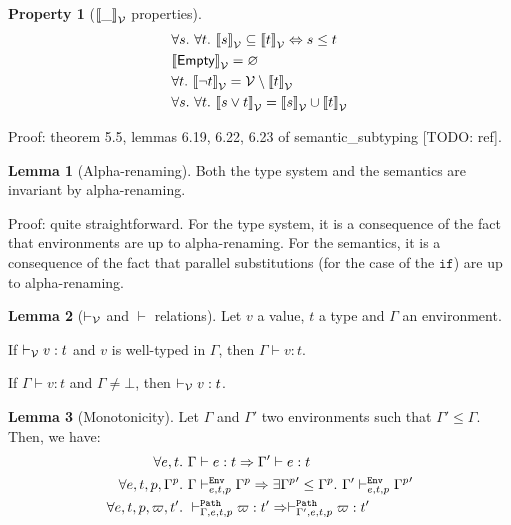 \documentclass[a4paper]{article}
\theoremstyle{definition}
\newtheorem{lemma}{Lemma}
\newtheorem{property}{Property}
\begin{document}
        \begin{property}[$\valsemantic \_$ properties]
          \begin{align*}
            &\forall s.\ \forall t.\ \valsemantic s \subseteq \valsemantic t \Leftrightarrow s \leq t\\
            &\valsemantic \Empty = \varnothing\\
            &\forall t.\ \valsemantic {\neg t} = \values \setminus \valsemantic t\\
            &\forall s.\ \forall t.\ \valsemantic {s\vee t} = \valsemantic s \cup \valsemantic t
          \end{align*}
        \end{property}
        Proof: theorem 5.5, lemmas 6.19, 6.22, 6.23 of semantic_subtyping [TODO: ref].

        \begin{lemma}[Alpha-renaming]
          Both the type system and the semantics are invariant by alpha-renaming.
        \end{lemma}
        Proof: quite straightforward.
        For the type system, it is a consequence of the fact that environments are up to alpha-renaming.
        For the semantics, it is a consequence of the fact that parallel substitutions (for the case of the $\texttt{if}$)
        are up to alpha-renaming.

        \begin{lemma}[$\vvdash$ and $\vdash$ relations]Let $v$ a value, $t$ a type and $\Gamma$ an environment.

          If $\vvdash v:t$ and $v$ is well-typed in $\Gamma$, then $\Gamma\vdash v:t$.

          If $\Gamma \vdash v:t$ and $\Gamma\neq\bot$, then $\vvdash v:t$.
        \end{lemma}
    
        \begin{lemma}[Monotonicity]
          Let $\Gamma$ and $\Gamma'$ two environments such that $\Gamma' \leq \Gamma$.
          Then, we have:
          \begin{align*}
            \forall e,t.\ &\Gamma \vdash e:t \Rightarrow \Gamma' \vdash e:t\\
            \forall e,t,p,\Gamma^p.\ &\Gamma \evdash p e t \Gamma^p \Rightarrow \exists {\Gamma^p}'\leq \Gamma^p.\ \Gamma' \evdash p e t {\Gamma^p}'\\
            \forall e,t,p,\varpi,t'.\ &\pvdash \Gamma p e t \varpi:t' \Rightarrow \pvdash {\Gamma'} p e t \varpi:t'
          \end{align*}
        \end{lemma}
\end{document}

